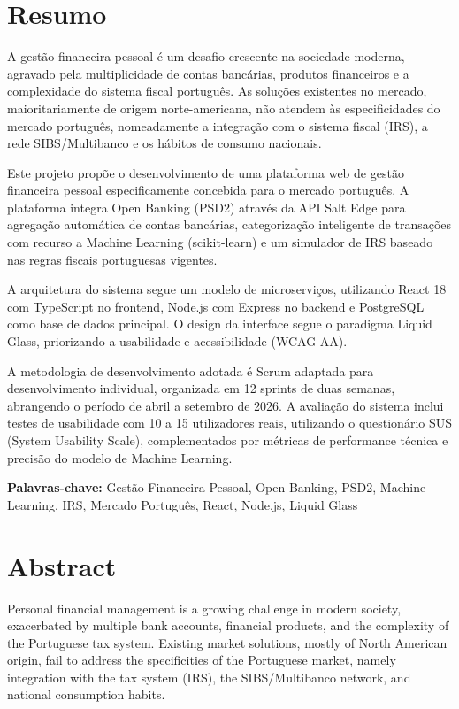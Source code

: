 \chapter*{Resumo}

A gestão financeira pessoal é um desafio crescente na sociedade moderna, agravado pela multiplicidade de contas bancárias, produtos financeiros e a complexidade do sistema fiscal português. As soluções existentes no mercado, maioritariamente de origem norte-americana, não atendem às especificidades do mercado português, nomeadamente a integração com o sistema fiscal (IRS), a rede SIBS/Multibanco e os hábitos de consumo nacionais.

Este projeto propõe o desenvolvimento de uma plataforma web de gestão financeira pessoal especificamente concebida para o mercado português. A plataforma integra Open Banking (PSD2) através da API Salt Edge para agregação automática de contas bancárias, categorização inteligente de transações com recurso a Machine Learning (scikit-learn) e um simulador de IRS baseado nas regras fiscais portuguesas vigentes.

A arquitetura do sistema segue um modelo de microserviços, utilizando React 18 com TypeScript no frontend, Node.js com Express no backend e PostgreSQL como base de dados principal. O design da interface segue o paradigma Liquid Glass, priorizando a usabilidade e acessibilidade (WCAG AA).

A metodologia de desenvolvimento adotada é Scrum adaptada para desenvolvimento individual, organizada em 12 sprints de duas semanas, abrangendo o período de abril a setembro de 2026. A avaliação do sistema inclui testes de usabilidade com 10 a 15 utilizadores reais, utilizando o questionário SUS (System Usability Scale), complementados por métricas de performance técnica e precisão do modelo de Machine Learning.

\vspace{0.5cm}
\noindent\textbf{Palavras-chave:} Gestão Financeira Pessoal, Open Banking, PSD2, Machine Learning, IRS, Mercado Português, React, Node.js, Liquid Glass

\chapter*{Abstract}

Personal financial management is a growing challenge in modern society, exacerbated by multiple bank accounts, financial products, and the complexity of the Portuguese tax system. Existing market solutions, mostly of North American origin, fail to address the specificities of the Portuguese market, namely integration with the tax system (IRS), the SIBS/Multibanco network, and national consumption habits.


